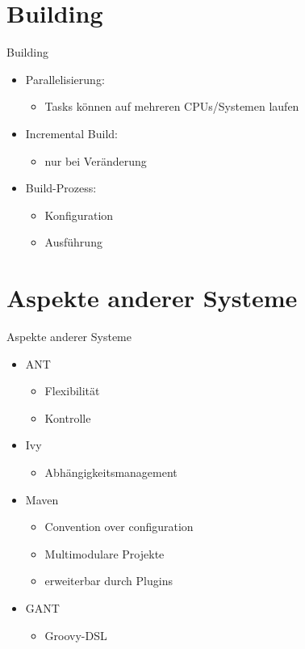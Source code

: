 \documentclass[10pt, xcolor=x11names]{beamer}			%
\begin{document}
	\section{Building}
	\begin{frame}{Building}
		\begin{itemize}[<+->]
			\item Parallelisierung:
			\begin{itemize}[<+->]
				\item Tasks können auf mehreren CPUs/Systemen laufen
			\end{itemize}
			\item Incremental Build:
			\begin{itemize}[<+->]
				\item nur bei Veränderung
			\end{itemize}
			\item Build-Prozess:
			\begin{itemize}[<+->]
				\item Konfiguration
				\item Ausführung
			\end{itemize}
		\end{itemize}
	\end{frame}
	
	\section{Aspekte anderer Systeme}
	\begin{frame}{Aspekte anderer Systeme}
		\begin{itemize}[<+->]
			\item ANT
			\begin{itemize}[<+->]
				\item Flexibilität
				\item Kontrolle
			\end{itemize}
			\item Ivy
			\begin{itemize}[<+->]
				\item Abhängigkeitsmanagement
			\end{itemize}
			\item Maven
			\begin{itemize}[<+->]
				\item Convention over configuration
				\item Multimodulare Projekte
				\item erweiterbar durch Plugins
			\end{itemize}
			\item GANT
			\begin{itemize}[<+->]
				\item Groovy-DSL
			\end{itemize}
		\end{itemize}
	\end{frame}
\end{document}
